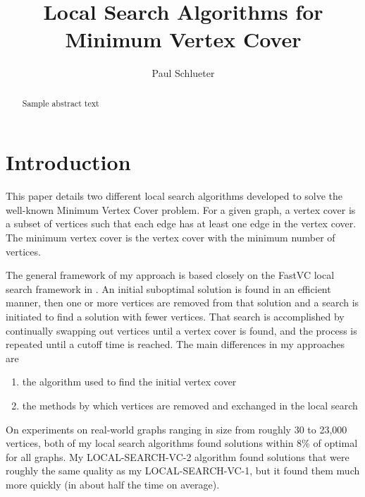 \documentclass[sigconf]{acmart}
\begin{document}
\title{Local Search Algorithms for Minimum Vertex Cover}

\author{Paul Schlueter}

\begin{abstract}
Sample abstract text
\end{abstract}


\maketitle
 
\section{Introduction} \label{sec:intro}
This paper details two different local search algorithms developed to solve the well-known Minimum Vertex Cover problem. For a given graph, a vertex cover is a subset of vertices such that each edge has at least one edge in the vertex cover. The minimum vertex cover is the vertex cover with the minimum number of vertices. 

The general framework of my approach is based closely on the FastVC local search framework in \cite{cai2015fastvc}. An initial suboptimal solution is found in an efficient manner, then one or more vertices are removed from that solution and a search is initiated to find a solution with fewer vertices. That search is accomplished by continually swapping out vertices until a vertex cover is found, and the process is repeated until a cutoff time is reached. The main differences in my approaches are
\begin{enumerate}
	\item the algorithm used to find the initial vertex cover
	\item the methods by which vertices are removed and exchanged in the local search
\end{enumerate}

On experiments on real-world graphs ranging in size from roughly 30 to 23,000 vertices, both of my local search algorithms found solutions within 8\% of optimal for all graphs. My LOCAL-SEARCH-VC-2 algorithm found solutions that were roughly the same quality as my LOCAL-SEARCH-VC-1, but it found them much more quickly (in about half the time on average).
\end{document}
